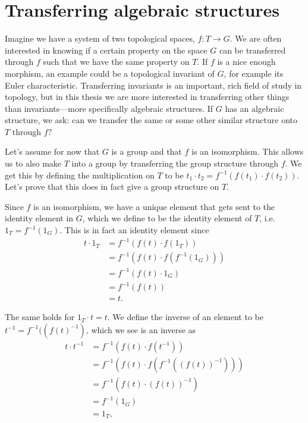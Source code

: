 

\section{Transferring algebraic structures}

Imagine we have a system of two topological spaces, $f:T\longrightarrow G$. We are often interested in knowing if a certain property on the space $G$ can be transferred through $f$ such that we have the same property on $T$. If $f$ is a nice enough morphism, an example could be a topological invariant of $G$, for example its Euler characteristic. Transferring invariants is an important, rich field of study in topology, but in this thesis we are more interested in transferring other things than invariants---more specifically algebraic structures. If $G$ has an algebraic structure, we ask: can we transfer the same or some other similar structure onto $T$ through $f$?

Let's assume for now that $G$ is a group and that $f$ is an isomorphism. This allows us to also make $T$ into a group by transferring the group structure through $f$. We get this by defining the multiplication on $T$ to be $t_1\cdot t_2 = f^{-1}(f(t_1)\cdot f(t_2))$. Let's prove that this does in fact give a group structure on $ T$. 

Since $ f$ is an isomorphism, we have a unique element that gets sent to the identity element in $ G$, which we define to be the identity element of $ T$, i.e. $ 1_T = f^{-1}(1_G)$. This is in fact an identity element since
\begin{align*} 
t\cdot 1_T &= f^{-1}(f(t)\cdot f(1_T)) \\ 
&= f^{-1}(f(t)\cdot f(f^{-1}(1_G))) \\ 
&= f^{-1}(f(t)\cdot 1_G) \\ 
&= f^{-1}(f(t)) \\ 
&= t . 
\end{align*}

 
The same holds for $ 1_T\cdot t = t$. We define the inverse of an element to be $ t^{-1} = f^{-1}((f(t)^{-1})$, which we see is an inverse as
\begin{align*} 
t\cdot t^{-1} 
&= f^{-1}(f(t)\cdot f(t^{-1})) \\ 
&= f^{-1}(f(t)\cdot f(f^{-1}((f(t))^{-1}))) \\ 
&= f^{-1}(f(t)\cdot (f(t))^{-1}) \\ 
&= f^{-1}(1_G) \\ 
&= 1_T, 
\end{align*}

